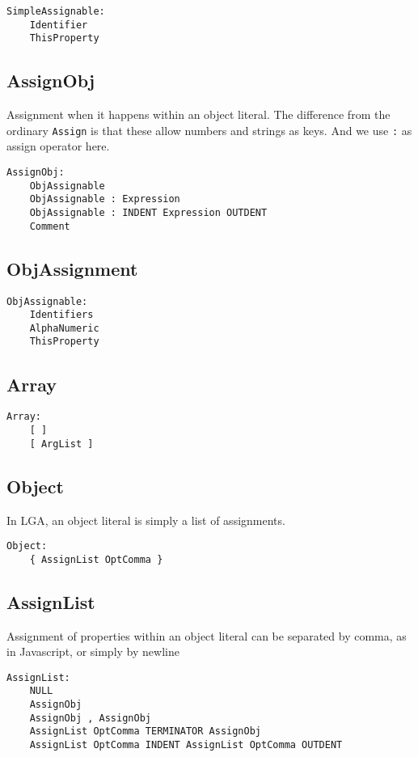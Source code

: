 \documentclass[10pt]{report}
\begin{document}
\begin{verbatim}
SimpleAssignable:
    Identifier
    ThisProperty
\end{verbatim}


\subsection{AssignObj}

Assignment when it happens within an object literal. The difference from the ordinary \texttt{Assign} is that these allow numbers and strings as keys. And we use \texttt{:} as assign operator here.
\begin{verbatim}
AssignObj:
    ObjAssignable
    ObjAssignable : Expression
    ObjAssignable : INDENT Expression OUTDENT
    Comment
\end{verbatim}

\subsection{ObjAssignment}
\begin{verbatim}
ObjAssignable:
    Identifiers
    AlphaNumeric
    ThisProperty
\end{verbatim}

\subsection{Array}

\begin{verbatim}
Array:
    [ ]
    [ ArgList ]
\end{verbatim}

\subsection{Object}

In LGA, an object literal is simply a list of assignments.
\begin{verbatim}
Object:
    { AssignList OptComma }
\end{verbatim}


\subsection{AssignList}

Assignment of properties within an object literal can be separated by comma, as in Javascript, or simply by newline
\begin{verbatim}
AssignList:
    NULL
    AssignObj
    AssignObj , AssignObj
    AssignList OptComma TERMINATOR AssignObj
    AssignList OptComma INDENT AssignList OptComma OUTDENT
\end{verbatim}
\end{document}
